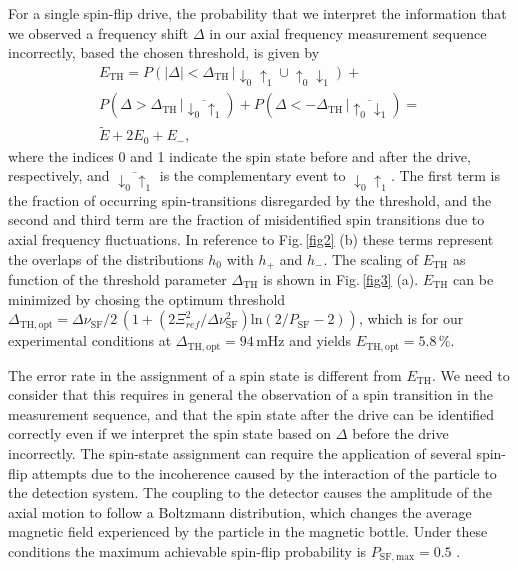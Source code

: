 \documentclass[preprint%
]{elsarticle}
\begin{document}
For a single spin-flip drive, the probability that we interpret the information that we observed a frequency shift $\Delta$ in our axial frequency measurement sequence incorrectly, based the chosen threshold, is given by 
\begin{eqnarray}
E_{\mathrm{TH}} = P(|\Delta|<\Delta_{\mathrm{TH}}\,|\downarrow_0\uparrow_1\cup\uparrow_0\downarrow_1)+\nonumber\\
 P(\Delta >\Delta_{\mathrm{TH}}\,|\overline{\downarrow_0\uparrow_1}) + P(\Delta < -\Delta_{\mathrm{TH}}\,|\overline{\uparrow_0\downarrow_1})=\nonumber\\
\tilde{E} + 2 E_0 + E_-,
\end{eqnarray}
where the indices 0 and 1 indicate the spin state before and after the drive, respectively, and $\overline{\downarrow_0\uparrow_1}$ is the complementary event to $\downarrow_0\uparrow_1$. The first term is the fraction of occurring spin-transitions disregarded by the threshold, and the second and third term are the fraction of misidentified spin transitions due to axial frequency fluctuations. In reference to Fig.$\,$\ref{fig2} (b) these terms represent the overlaps of the distributions $h_0$ with $h_+$ and $h_-$. The scaling of $E_{\mathrm{TH}}$ as function of the threshold parameter $\Delta_{\mathrm{TH}}$ is shown in Fig.$\,$\ref{fig3} (a). $E_{\mathrm{TH}}$ can be minimized by chosing the optimum threshold $\Delta_{\mathrm{TH,opt}}=\Delta\nu_{\mathrm{SF}}/2\,(1+(2 \Xi_{ref}^2/\Delta\nu_{\mathrm{SF}}^2) \mathrm{ln}(2/P_{\mathrm{SF}}-2))$, which is for our experimental conditions at $\Delta_{\mathrm{TH,opt}} = 94\,$mHz and yields $E_{\mathrm{TH,opt}} = 5.8\,\%$. 

The error rate in the assignment of a spin state is different from $E_{\mathrm{TH}}$. We need to consider that this requires in general the observation of a spin transition in the measurement sequence, and that the spin state after the drive can be identified correctly even if we interpret the spin state based on $\Delta$ before the drive incorrectly. The spin-state assignment can require the application of several spin-flip attempts due to the incoherence caused by the interaction of the particle to the detection system. The coupling to the detector causes the amplitude of the axial motion to follow a Boltzmann distribution, which changes the average magnetic field experienced by the particle in the magnetic bottle. Under these conditions the maximum achievable spin-flip probability is $P_{\mathrm{SF,max}} = 0.5$ \cite{BrownGeoniumLineshape}. 
\end{document}
